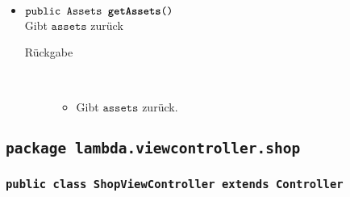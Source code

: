 \begin{description}
\begin{itemize}
		\item $\texttt{public Assets \textbf{getAssets}()}$ \\ Gibt $\texttt{assets}$ zurück
		\begin{description}
			\item[Rückgabe] \hfill \\
			\vspace{-.8cm}
			\begin{itemize}
				\item Gibt $\texttt{assets}$ zurück.
			\end{itemize}
			\end{description}

		\end{itemize}
	\end{description}



\subsection{\texttt{package lambda.viewcontroller.shop}}

\subsubsection{\normalfont \texttt{public class \textbf{ShopViewController} extends Controller}}

